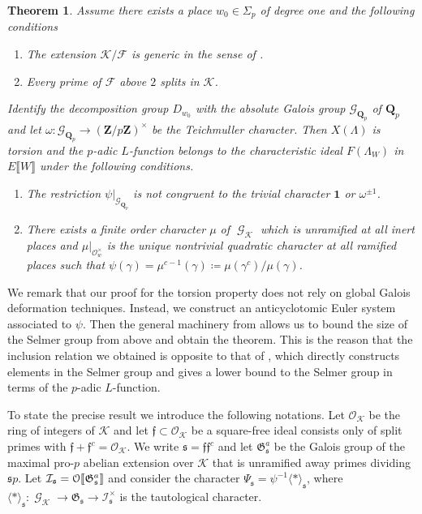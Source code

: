 \documentclass[leqno]{amsart}
\newtheorem{thm}{Theorem}[section]
\theoremstyle{definition}
\theoremstyle{remark}
\newcommand{\id}{\mathbf{1}}
\newcommand{\oo}{\mathcal{O}}
\newcommand{\eo}{\EuScript{O}}
\newcommand{\Z}{{\mathbf{Z}}}
\newcommand{\Qp}{\mathbf{Q}_p}
\DeclareMathOperator{\Gal}{\mathcal{G}}
\newcommand{\ff}{\mathfrak{f}}
\newcommand{\fs}{\mathfrak{s}}
\newcommand{\Gp}{\mathcal{G}_{\Qp}} %
\newcommand{\F}{{\mathcal{F}}} %
\newcommand{\K}{{\mathcal{K}}} %
\newcommand{\fG}{\mathfrak{G}}
\newcommand{\I}{\mathcal{I}} %
\begin{document}
\begin{thm}

Assume there exists a place $w_0\in\Sigma_p$ of degree one
and the following conditions
\begin{enumerate}[label=($\K$\arabic*)]
\item The extension $\K/\F$ is generic 
in the sense of \cite{Rohrlich}.
\label{cond:K2in}
\item Every prime of $\F$ above $2$ splits in $\K$.
\label{cond:K3in}
\end{enumerate}
Identify the decomposition group $D_{w_0}$
with the absolute Galois group $\Gp$ of $\Qp$
and let $\omega\colon \Gp\to (\Z/p\Z)^\times$ be the Teichmuller character.
Then $X(\Lambda)$ is torsion and the $p$-adic $L$-function belongs to 
the characteristic ideal $F(\Lambda_W)$ in 
$E\llbracket W\rrbracket$ under the following conditions.
\begin{enumerate}[label=($\psi$\arabic*)]
\item  The restriction $\psi\vert_{\Gp}$ is not congruent
to the trivial character $\id$ or $\omega^{\pm1}$.
\label{cond:psi1in}
\item There exists a finite order character $\mu$ of $\Gal_\K$
which is unramified at all inert places and 
$\mu\vert_{\oo_w^\times}$ is the unique nontrivial
quadratic character at all ramified places such that
$\psi(\gamma)=\mu^{c-1}(\gamma)\coloneqq\mu(\gamma^c)/\mu(\gamma)$.
\label{cond:psi2in}
\end{enumerate}
\end{thm}

We remark that our proof for the torsion property
does not rely on global Galois deformation techniques.
Instead, we construct 
an anticyclotomic Euler system associated to $\psi$.
Then the general machinery from \cite{Rubin}
allows us to bound the size
of the Selmer group from above and obtain the theorem.
This is the reason that the inclusion relation
we obtained is opposite to that of \cite{HT94},
which directly constructs elements in the Selmer 
group and gives a lower bound to the Selmer group
in terms of the $p$-adic $L$-function.


To state the precise result 
we introduce the following notations.
Let $\oo_\K$ be the ring of integers of $\K$
and let $\ff\subset \oo_\K$ be a square-free ideal
consists only of split primes
with $\ff+\ff^c=\oo_\K$. 
We write $\fs=\ff\ff^c$
and let $\fG_\fs^a$ be the Galois group of the maximal 
pro-$p$ abelian extension over $\K$ that is unramified 
away primes dividing $\fs p$.
Let $\I_\fs=\eo\llbracket \fG_\fs^a\rrbracket$
and consider the character $\Psi_\fs=\psi^{-1}\langle*\rangle_\fs$,
where $\langle*\rangle_\fs\colon \Gal_\K\to \fG_\fs\to \I_\fs^\times$
is the tautological character.
\end{document}
